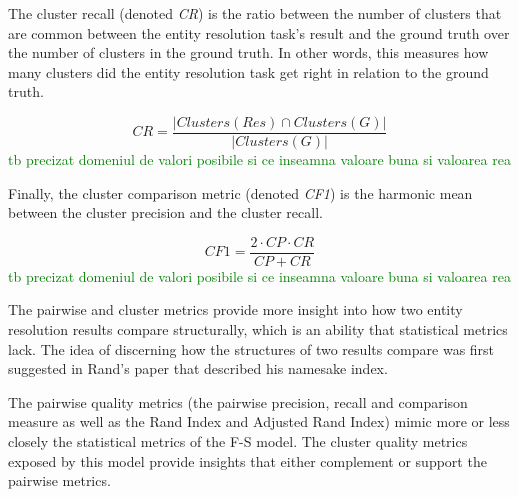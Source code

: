 The cluster recall (denoted \textit{CR}) is the ratio between the number of
clusters that are common between the entity resolution task's result and
the ground truth over the number of clusters in the ground truth.
In other words, this measures how many clusters did the entity resolution
task get right in relation to the ground truth.

\[
    CR = \frac{|Clusters(Res) \cap Clusters(G)|}{|Clusters(G)|}
\]
\textcolor{green}{tb precizat domeniul de valori posibile si ce inseamna valoare buna si valoarea rea}

Finally, the cluster comparison metric (denoted \textit{CF1}) is the
harmonic mean between the cluster precision and the cluster recall.

\[
    CF1 = \frac{2 \cdot CP \cdot CR}{CP + CR}
\]
\textcolor{green}{tb precizat domeniul de valori posibile si ce inseamna valoare buna si valoarea rea}

The pairwise and cluster metrics provide more insight into how two entity
resolution results compare structurally, which is an ability that statistical
metrics lack.
The idea of discerning how the structures of two results compare was first
suggested in Rand's paper that described his namesake index\cite{rand1971}.

The pairwise quality metrics (the pairwise precision, recall and
comparison measure as well as the Rand Index and Adjusted Rand Index) mimic
more or less closely the statistical metrics of the F-S model.
The cluster quality metrics exposed by this model provide insights that
either complement or support the pairwise metrics.
